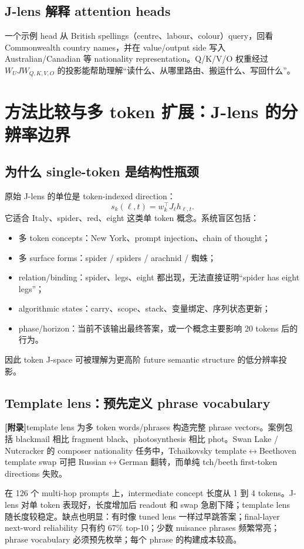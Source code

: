 \documentclass[10.5pt,a4paper]{ctexart}
\newcommand{\AppendixTag}{\textbf{[附录]}}
\begin{document}
\subsection{J-lens 解释 attention heads}
一个示例 head 从 British spellings（centre、labour、colour）query，回看 Commonwealth country names，并在 value/output side 写入 Australian/Canadian 等 nationality representation。Q/K/V/O 权重经过 $W_UJ W_{Q,K,V,O}$ 的投影能帮助理解“读什么、从哪里路由、搬运什么、写回什么”。

\section{方法比较与多 token 扩展：J-lens 的分辨率边界}

\subsection{为什么 single-token 是结构性瓶颈}
原始 J-lens 的单位是 token-indexed direction：
\[
s_k(\ell,t)=w_k^\top J_\ell h_{\ell,t}.
\]
它适合 Italy、spider、red、eight 这类单 token 概念。系统盲区包括：
\begin{itemize}
\item 多 token concepts：New York、prompt injection、chain of thought；
\item 多 surface forms：spider / spiders / arachnid / 蜘蛛；
\item relation/binding：spider、legs、eight 都出现，无法直接证明“spider has eight legs”；
\item algorithmic states：carry、scope、stack、变量绑定、序列状态更新；
\item phase/horizon：当前不该输出最终答案，或一个概念主要影响 20 tokens 后的行为。
\end{itemize}
因此 token J-space 可被理解为更高阶 future semantic structure 的低分辨率投影。

\subsection{Template lens：预先定义 phrase vocabulary}
\AppendixTag template lens 为多 token words/phrases 构造完整 phrase vectors。案例包括 blackmail 相比 fragment black、photosynthesis 相比 phot。Swan Lake / Nutcracker 的 composer nationality 任务中，Tchaikovsky template$\leftrightarrow$Beethoven template swap 可把 Russian$\leftrightarrow$German 翻转，而单纯 tch/beeth first-token directions 失败。

在 126 个 multi-hop prompts 上，intermediate concept 长度从 1 到 4 tokens。J-lens 对单 token 表现好，长度增加后 readout 和 swap 急剧下降；template lens 随长度较稳定。缺点也明显：有时像 tuned lens 一样过早跳答案；final-layer next-word reliability 只有约 67\% top-10；少数 nuisance phrases 频繁常亮；phrase vocabulary 必须预先枚举；每个 phrase 的构建成本较高。
\end{document}
